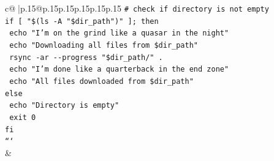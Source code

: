 \documentclass{article}
\begin{document}
{\begin{supertabular}{c@{$\;$}|p{.15\linewidth}@{}p{.15\linewidth}p{.15\linewidth}p{.15\linewidth}p{.15\linewidth}p{.15\linewidth}}
{{{\texttt{\# check if directory is not empty} \\
\texttt{if {[} "\$(ls {-}A "\$dir\_path")" {]}; then} \\
\texttt{  echo "I'm on the grind like a quasar in the night"} \\
\texttt{  echo "Downloading all files from \$dir\_path"} \\
\texttt{  rsync {-}ar {-}{-}progress "\$dir\_path/" .} \\
\texttt{  echo "I'm done like a quarterback in the end zone"} \\
\texttt{  echo "All files downloaded from \$dir\_path"} \\
\texttt{else} \\
\texttt{  echo "Directory is empty"} \\
\texttt{  exit 0} \\
\texttt{fi} \\
\texttt{```} \\
            }
        }
    }
    & \\ \\

\end{supertabular}
}
\end{document}
